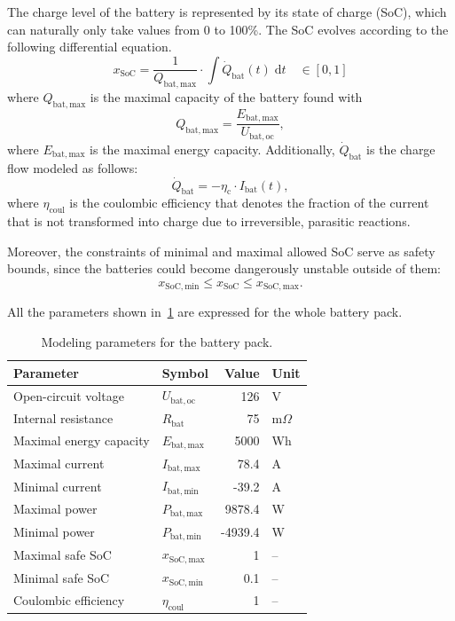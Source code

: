 The charge level of the battery is represented by its state of charge (SoC), which can naturally only take values from 0 to 100\%. The SoC evolves according to the following differential equation.
\begin{equation}
	x_\mathrm{SoC} = \frac{1}{Q_\mathrm{bat,max}} \cdot \int \dot{Q}_\mathrm{bat}(t) \;\mathrm{d}t \quad \in [0,1]
\end{equation}
where $Q_\mathrm{bat,max}$ is the maximal capacity of the battery found with
\begin{equation}
	Q_\mathrm{bat,max} = \frac{E_\mathrm{bat,max}}{U_\mathrm{bat,oc}},
\end{equation}
where $E_\mathrm{bat,max}$ is the maximal energy capacity. Additionally, $\dot{Q}_\mathrm{bat}$ is the charge flow modeled as follows:
\begin{equation}
	\dot{Q}_\mathrm{bat} = - \eta_\mathrm{c} \cdot I_\mathrm{bat}(t),
\end{equation}
where $\eta_\mathrm{coul}$ is the coulombic efficiency that denotes the fraction of the current that is not transformed into charge due to irreversible, parasitic reactions.

Moreover, the constraints of minimal and maximal allowed SoC serve as safety bounds, since the batteries could become dangerously unstable outside of them:
\begin{equation}
	x_\mathrm{SoC,min} \leq x_\mathrm{SoC} \leq x_\mathrm{SoC,max}.
\end{equation}

All the parameters shown in~\cref{tab:modelingParametersBattery} are expressed for the whole battery pack.
\begin{table}[htbp]
	\centering
	\caption{Modeling parameters for the battery pack.}
	\label{tab:modelingParametersBattery}
	
	\begin{tabular}{l l r l}
		\toprule
		Parameter 				& Symbol 				& Value 	& Unit\\ 
		\midrule
		Open-circuit voltage 	& $U_\mathrm{bat,oc}$   & 126     	& \unit{V} \\
		Internal resistance 	& $R_\mathrm{bat}$      & 75   		& \unit{m$\Omega$} \\
		Maximal energy capacity	& $E_\mathrm{bat,max}$  & 5000    	& \unit{Wh} \\
		Maximal current 		& $I_\mathrm{bat,max}$  & 78.4    	& \unit{A} \\
		Minimal current 		& $I_\mathrm{bat,min}$  & -39.2    	& \unit{A} \\
		Maximal power 			& $P_\mathrm{bat,max}$  & 9878.4    & \unit{W} \\
		Minimal power 			& $P_\mathrm{bat,min}$  & -4939.4	& \unit{W} \\
		Maximal safe SoC		& $x_\mathrm{SoC,max}$  & 1    		& -- \\
		Minimal safe SoC 		& $x_\mathrm{SoC,min}$  & 0.1  		& -- \\
		Coulombic efficiency	& $\eta_\mathrm{coul}$		& 1			& -- \\
		\bottomrule
	\end{tabular}
\end{table}


